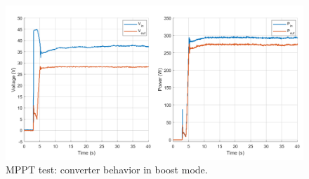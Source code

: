 \begin{figure}[H]
	\begin{center}
		\includegraphics[width=1\textwidth]{../Pictures/P1/Test/Buck_mode_MPPT_Vin_Vout_Pin_Pout}
		\caption{MPPT test: converter behavior in boost mode.}
		\label{MPPTtestboostmode2}
	\end{center}	
\end{figure}




